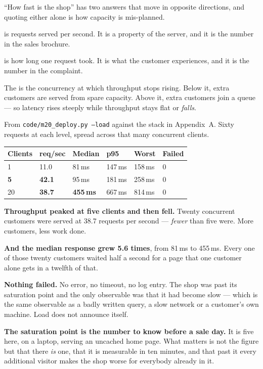 ``How fast is the shop'' has two answers that move in opposite directions, and
quoting either alone is how capacity is mis-planned.

\begin{definitionbox}
 is requests served per second. It is a property of the
server, and it is the number in the sales brochure.

\smallskip
{} is how long one request took. It is what the customer
experiences, and it is the number in the complaint.

\smallskip
The  is the concurrency at which throughput stops
rising. Below it, extra customers are served from spare capacity. Above it,
extra customers join a queue --- so latency rises steeply while throughput
stays flat or \emph{falls}.
\end{definitionbox}

\begin{measured}
From \texttt{code/m20\_deploy.py --load} against the stack in Appendix~A.
Sixty requests at each level, spread across that many concurrent clients.

\begin{longtable}{@{}L{2.0cm}L{2.1cm}L{2.2cm}L{2.0cm}L{2.2cm}L{1.8cm}@{}}
\toprule
{}
\textbf{Clients} & \textbf{req/sec} & \textbf{Median} & \textbf{p95} &
\textbf{Worst} & \textbf{Failed} \\
\midrule
{} & 11.0 & 81\,ms & 147\,ms & 158\,ms & 0 \\
\textbf{5} & \textbf{42.1} & 95\,ms & 181\,ms & 258\,ms & 0 \\
20 & \textbf{38.7} & \textbf{455\,ms} & 667\,ms & 814\,ms & 0 \\
\bottomrule
\end{longtable}

\smallskip
\textbf{Throughput peaked at five clients and then fell.} Twenty concurrent
customers were served at 38.7 requests per second --- \emph{fewer} than five
were. More customers, less work done.

\smallskip
\textbf{And the median response grew 5.6 times}, from 81\,ms to 455\,ms. Every
one of those twenty customers waited half a second for a page that one customer
alone gets in a twelfth of that.

\smallskip
\textbf{Nothing failed.} No error, no timeout, no log entry. The shop was past
its saturation point and the only observable was that it had become slow ---
which is the same observable as a badly written query, a slow network or a
customer's own machine. Load does not announce itself.

\smallskip
\textbf{The saturation point is the number to know before a sale day.} It is
five here, on a laptop, serving an uncached home page. What matters is not the
figure but that there \emph{is} one, that it is measurable in ten minutes, and
that past it every additional visitor makes the shop worse for everybody
already in it.
\end{measured}

